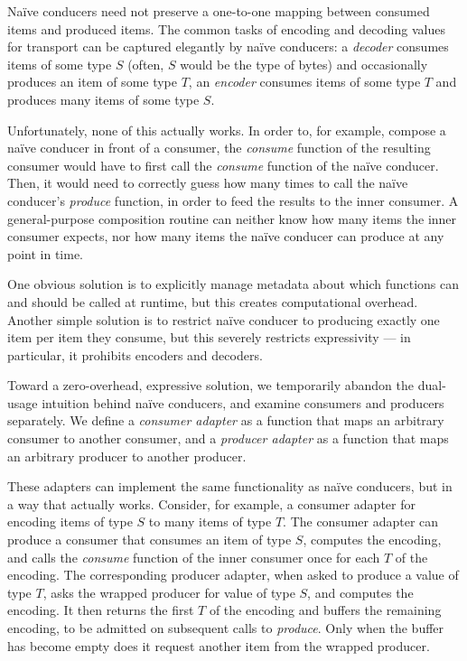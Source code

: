 \documentclass[sigplan,screen,10pt,review]{acmart}
\begin{document}
Naïve conducers need not preserve a one-to-one mapping between consumed items and produced items. The common tasks of encoding and decoding values for transport can be captured elegantly by naïve conducers: a \textit{decoder} consumes items of some type $S$ (often, $S$ would be the type of bytes) and occasionally produces an item of some type $T$, an \textit{encoder} consumes items of some type $T$ and produces many items of some type $S$.

Unfortunately, none of this actually works. In order to, for example, compose a naïve conducer in front of a consumer, the \textit{consume} function of the resulting consumer would have to first call the \textit{consume} function of the naïve conducer. Then, it would need to correctly guess how many times to call the naïve conducer's \textit{produce} function, in order to feed the results to the inner consumer. A general-purpose composition routine can neither know how many items the inner consumer expects, nor how many items the naïve conducer can produce at any point in time.

One obvious solution is to explicitly manage metadata about which functions can and should be called at runtime, but this creates computational overhead. Another simple solution is to restrict naïve conducer to producing exactly one item per item they consume, but this severely restricts expressivity --- in particular, it prohibits encoders and decoders.

Toward a zero-overhead, expressive solution, we temporarily abandon the dual-usage intuition behind naïve conducers, and examine consumers and producers separately. We define a \textit{consumer adapter} as a function that maps an arbitrary consumer to another consumer, and a \textit{producer adapter} as a function that maps an arbitrary producer to another producer.

These adapters can implement the same functionality as naïve conducers, but in a way that actually works. Consider, for example, a consumer adapter for encoding items of type $S$ to many items of type $T$. The consumer adapter can produce a consumer that consumes an item of type $S$, computes the encoding, and calls the \textit{consume} function of the inner consumer once for each $T$ of the encoding. The corresponding producer adapter, when asked to produce a value of type $T$, asks the wrapped producer for value of type $S$, and computes the encoding. It then returns the first $T$ of the encoding and buffers the remaining encoding, to be admitted on subsequent calls to \textit{produce}. Only when the buffer has become empty does it request another item from the wrapped producer.
\end{document}
